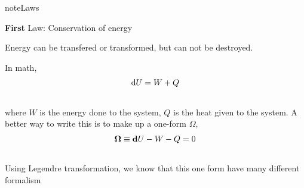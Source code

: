 \documentclass[letterpaper,10pt,english]{sphinxmanual}
\begin{document}
\begin{notice}{note}{Laws}

\textbf{First} Law: Conservation of energy

Energy can be transfered or transformed, but can not be destroyed.

In math,
\begin{gather}
\begin{split}\mathrm d U  = W + Q\end{split}\notag\\\begin{split}\end{split}\notag
\end{gather}
where $W$ is the energy done to the system, $Q$ is the heat given to the system. A better way to write this is to make up a one-form $\Omega$,
\begin{gather}
\begin{split}\mathbf\Omega \equiv \mathbf d U  - W - Q =0\end{split}\notag\\\begin{split}\end{split}\notag
\end{gather}
Using Legendre transformation, we know that this one form have many different formalism
\end{notice}
\end{document}
